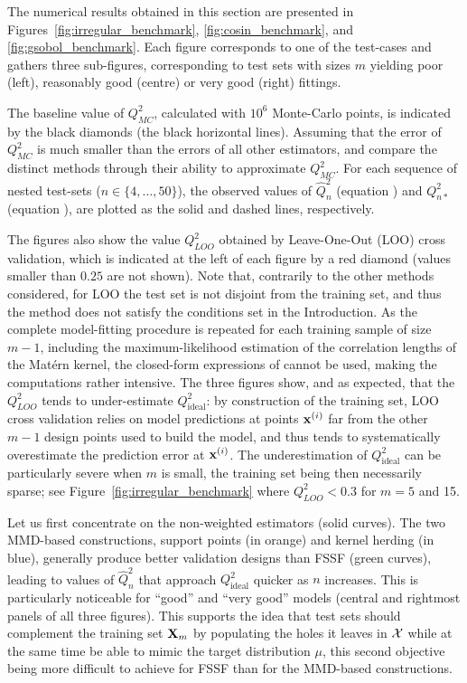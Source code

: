 The numerical results obtained in this section are presented in Figures~\ref{fig:irregular_benchmark}, \ref{fig:cosin_benchmark}, and \ref{fig:gsobol_benchmark}. 
Each figure corresponds to one of the test-cases and gathers three sub-figures, corresponding to test sets with sizes $m$ yielding poor (left), reasonably good (centre) or very good (right) fittings. 
 
The baseline value of $Q_{MC}^2$, calculated with $10^6$ Monte-Carlo points, is indicated by the black diamonds (the black horizontal lines).
Assuming that the error of $Q_{MC}^2$ is much smaller than the errors of all other estimators, and compare the distinct methods through their ability to approximate $Q_{MC}^2$. 
For each sequence of nested test-sets ($n\in\{4,\ldots,50\}$), the observed values of $\widehat Q^2_n$ (equation ) and $Q_{n*}^2$ (equation ), are plotted as the solid and dashed lines, respectively. 

The figures also show the value $Q^2_{LOO}$ obtained by Leave-One-Out (LOO) cross validation, which is indicated at the left of each figure by a red diamond (values smaller than $0.25$ are not shown). 
Note that, contrarily to the other methods considered, for LOO the test set is not disjoint from the training set, and thus the method does not satisfy the conditions set in the Introduction. 
As the complete model-fitting procedure is repeated for each training sample of size $m-1$, including the maximum-likelihood estimation of the correlation lengths of the Matérn kernel, the closed-form expressions of \cite{Dubrule83} cannot be used, making the computations rather intensive. 
The three figures show, and as expected, that the $Q_{LOO}^2$ tends to under-estimate $Q_{\mathrm{ideal}}^2$: by construction of the training set, LOO cross validation relies on model predictions at points ${\bf x}^{(i)}$ far from the other $m-1$ design points used to build the model, and thus tends to systematically overestimate the prediction error at ${\bf x}^{(i)}$. 
The underestimation of $Q_{\mathrm{ideal}}^2$ can be particularly severe when $m$ is small, the training set being then necessarily sparse; see Figure~\ref{fig:irregular_benchmark} where $Q_{LOO}^2<0.3$ for $m=5$ and 15. 

Let us first concentrate on the non-weighted estimators (solid curves). 
The two MMD-based constructions, support points (in orange) and kernel herding (in blue), generally produce better validation designs than FSSF (green curves), leading to values of $\widehat Q^2_n$ that approach $Q_{\mathrm{ideal}}^2$ quicker as $n$ increases. 
This is particularly noticeable for ``good'' and ``very good'' models (central and rightmost panels of all three figures). 
This supports the idea that test sets should complement the training set ${\bf X}_m$ by populating the holes it leaves in $\mathcal{X}$ while at the same time be able to mimic the target distribution $\mu$, this second objective being more difficult to achieve for FSSF than for the MMD-based constructions. 

